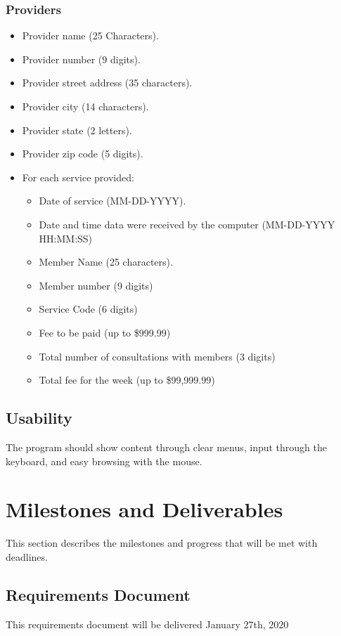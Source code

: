 \documentclass{article}
\begin{document}
\subsubsection{Providers}
\begin{itemize}
\item Provider name (25 Characters).
\item Provider number (9 digits).
\item Provider street address (35  characters).
\item Provider city (14 characters).
\item Provider state (2 letters).
\item Provider zip code (5 digits).
\item For each service provided:
\begin{itemize}
\item Date of service (MM-DD-YYYY).
\item Date and time data were received by the computer (MM-DD-YYYY HH:MM:SS)
\item Member Name (25 characters).
\item Member number (9 digits)
\item Service Code (6 digits)
\item Fee to be paid (up to \$999.99)
\item Total number of consultations with members (3 digits)
\item Total fee for the week (up to \$99,999.99)
\end{itemize}
\end{itemize}

\subsection{Usability}
The program should show content through clear menus, input through the keyboard, and easy browsing with the mouse.




\section{Milestones and Deliverables}
This section describes the milestones and progress that will be met with deadlines.


\subsection{Requirements Document}
This requirements document will be delivered January 27th, 2020
\end{document}
